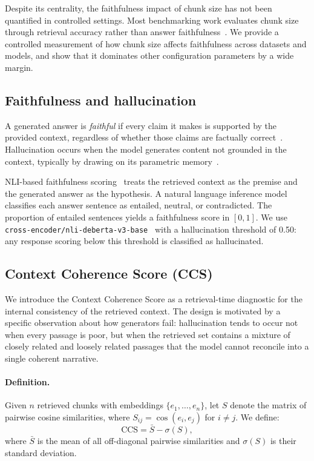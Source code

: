 Despite its centrality, the faithfulness impact of chunk size has not
been quantified in controlled settings. Most benchmarking work evaluates
chunk size through retrieval accuracy rather than answer
faithfulness~\citep{chen2024benchmarking}. We provide a controlled
measurement of how chunk size affects faithfulness across datasets and
models, and show that it dominates other configuration parameters by a
wide margin.

\subsection{Faithfulness and hallucination}

A generated answer is \emph{faithful} if every claim it makes is supported by
the provided context, regardless of whether those claims are factually
correct~\citep{maynez2020faithfulness}. Hallucination occurs when the model
generates content not grounded in the context, typically by drawing on its
parametric memory~\citep{ji2023hallucination, xu2024hallucination}.

NLI-based faithfulness scoring~\citep{es2024ragas, min2023factscore} treats
the retrieved context as the premise and the generated answer as the
hypothesis. A natural language inference model classifies each answer sentence
as entailed, neutral, or contradicted. The proportion of entailed sentences
yields a faithfulness score in $[0, 1]$. We use
\texttt{cross-encoder/nli-deberta-v3-base}~\citep{he2021deberta} with a
hallucination threshold of 0.50: any response scoring below this threshold
is classified as hallucinated.

\subsection{Context Coherence Score (CCS)}
\label{sec:ccs_def}

We introduce the Context Coherence Score as a retrieval-time diagnostic for
the internal consistency of the retrieved context. The design is motivated by
a specific observation about how generators fail: hallucination tends to
occur not when every passage is poor, but when the retrieved set contains a
mixture of closely related and loosely related passages that the model cannot
reconcile into a single coherent narrative.

\paragraph{Definition.}
Given $n$ retrieved chunks with embeddings $\{e_1, \ldots, e_n\}$, let $S$
denote the matrix of pairwise cosine similarities, where
$S_{ij} = \cos(e_i, e_j)$ for $i \neq j$. We define:
\begin{equation}
  \text{CCS} = \bar{S} - \sigma(S),
  \label{eq:ccs}
\end{equation}
where $\bar{S}$ is the mean of all off-diagonal pairwise similarities and
$\sigma(S)$ is their standard deviation.

